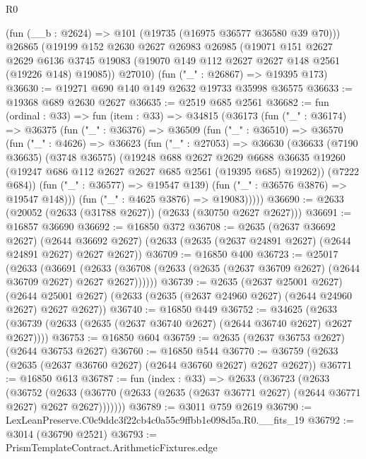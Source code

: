 \begin{lexlean}{R0}
\begin{coremodule}
    (fun (__b : @2624) => @101 (@19735 (@16975 @36577 @36580 @39 @70)))
    @26865
    (@19199
      @152
      @2630
      @2627
      @26983
      @26985
      (@19071
        @151
        @2627
        @2629
        @6136
        @3745
        @19083
        (@19070 @149 @112 @2627 @2627 @148 @2561 (@19226 @148) @19085))
      @27010)
    (fun ("_" : @26867) => @19395 @173)
@36630 := @19271 @690 @140 @149 @2632 @19733 @35998 @36575
@36633 := @19368 @689 @2630 @2627
@36635 := @2519 @685 @2561
@36682 := fun (ordinal : @33) =>
  fun (item : @33) =>
  @34815
    (@36173
      (fun ("_" : @36174) =>
      @36375
        (fun ("_" : @36376) =>
        @36509
          (fun ("_" : @36510) =>
          @36570
            (fun ("_" : @4626) =>
            @36623
              (fun ("_" : @27053) =>
              @36630
                (@36633
                  (@7190 @36635)
                  (@3748 @36575)
                  (@19248
                    @688
                    @2627
                    @2629
                    @6688
                    @36635
                    @19260
                    (@19247 @686 @112 @2627 @2627 @685 @2561 (@19395 @685) @19262))
                  (@7222 @684))
                (fun ("_" : @36577) => @19547 @139)
                (fun ("_" : @36576 @3876) => @19547 @148)))
            (fun ("_" : @4625 @3876) => @19083)))))
@36690 := @2633 (@20052 (@2633 (@31788 @2627)) (@2633 (@30750 @2627 @2627)))
@36691 := @16857 @36690
@36692 := @16850 @372
@36708 := @2635
    (@2637 @36692 @2627)
    (@2644 @36692 @2627)
    (@2633 (@2635 (@2637 @24891 @2627) (@2644 @24891 @2627) @2627 @2627))
@36709 := @16850 @400
@36723 := @25017
    (@2633
      (@36691
        (@2633 (@36708 (@2633 (@2635 (@2637 @36709 @2627) (@2644 @36709 @2627) @2627 @2627))))))
@36739 := @2635
    (@2637 @25001 @2627)
    (@2644 @25001 @2627)
    (@2633 (@2635 (@2637 @24960 @2627) (@2644 @24960 @2627) @2627 @2627))
@36740 := @16850 @449
@36752 := @34625
    (@2633 (@36739 (@2633 (@2635 (@2637 @36740 @2627) (@2644 @36740 @2627) @2627 @2627))))
@36753 := @16850 @604
@36759 := @2635 (@2637 @36753 @2627) (@2644 @36753 @2627)
@36760 := @16850 @544
@36770 := @36759 (@2633 (@2635 (@2637 @36760 @2627) (@2644 @36760 @2627) @2627 @2627))
@36771 := @16850 @613
@36787 := fun (index : @33) =>
  @2633
    (@36723
      (@2633
        (@36752
          (@2633 (@36770 (@2633 (@2635 (@2637 @36771 @2627) (@2644 @36771 @2627) @2627 @2627)))))))
@36789 := @3011 @759 @2619
@36790 := LexLeanPreserve.C0c9ddc3f22cb4c0a55c9ffbb1e098d5a.R0.__fits_19
@36792 := @3014 (@36790 @2521)
@36793 := PrismTemplateContract.ArithmeticFixtures.edge

\end{coremodule}
\end{lexlean}
